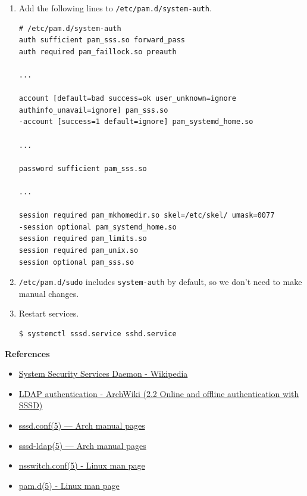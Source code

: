 \documentclass[12pt, a4paper]{article}
\begin{document}
\begin{enumerate}[label=(\alph*)]
\begin{enumerate}[label=(\arabic*)]
      \pagebreak
      \item Add the following lines to \verb|/etc/pam.d/system-auth|.
      \begin{Verbatim}[frame=single, fontsize=\footnotesize, breaklines]
# /etc/pam.d/system-auth
auth sufficient pam_sss.so forward_pass
auth required pam_faillock.so preauth

...

account [default=bad success=ok user_unknown=ignore authinfo_unavail=ignore] pam_sss.so
-account [success=1 default=ignore] pam_systemd_home.so

...

password sufficient pam_sss.so

...

session required pam_mkhomedir.so skel=/etc/skel/ umask=0077
-session optional pam_systemd_home.so
session required pam_limits.so
session required pam_unix.so
session optional pam_sss.so
      \end{Verbatim}

      \item \verb|/etc/pam.d/sudo| includes \verb|system-auth| by default, so
      we don't need to make manual changes.

      \item Restart services.
      \begin{Verbatim}[frame=single]
$ systemctl sssd.service sshd.service
      \end{Verbatim}
    \end{enumerate}

    \textbf{References}
    \begin{itemize}
      \item \href{https://en.wikipedia.org/wiki/System_Security_Services_Daemon}{System Security Services Daemon - Wikipedia}
      \item \href{https://wiki.archlinux.org/title/LDAP_authentication#Online_and_offline_authentication_with_SSSD}{LDAP authentication - ArchWiki (2.2 Online and offline authentication with SSSD)}
      \item \href{https://man.archlinux.org/man/sssd.conf.5}{sssd.conf(5) — Arch manual pages}
      \item \href{https://man.archlinux.org/man/sssd-ldap.5.en}{sssd-ldap(5) — Arch manual pages}
      \item \href{https://linux.die.net/man/5/nsswitch.conf}{nsswitch.conf(5) - Linux man page}
      \item \href{https://linux.die.net/man/5/pam.d}{pam.d(5) - Linux man page}
    \end{itemize}


\end{enumerate}
\end{document}
